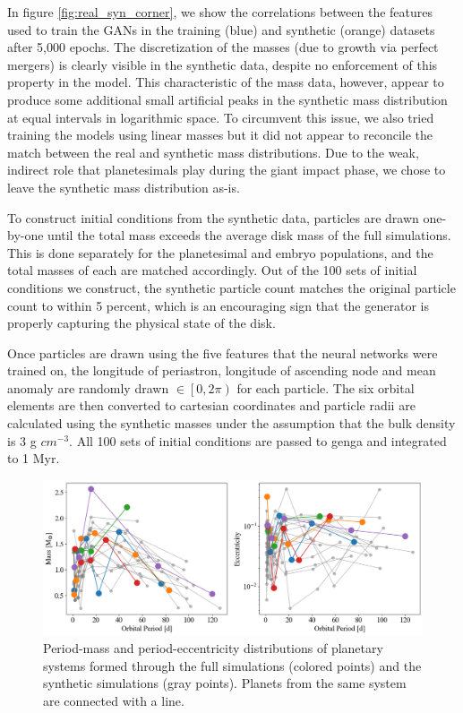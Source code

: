 
In figure \ref{fig:real_syn_corner}, we show the correlations between the features used to train the GANs in the training (blue) and synthetic (orange) datasets after 5,000 epochs. The discretization of the masses (due to growth via perfect mergers) is clearly visible in the synthetic data, despite no enforcement of this property in the model. This characteristic of the mass data, however, appear to produce some additional small artificial peaks in the synthetic mass distribution at equal intervals in logarithmic space. To circumvent this issue, we also tried training the models using linear masses but it did not appear to reconcile the match between the real and synthetic mass distributions. Due to the weak, indirect role that planetesimals play during the giant impact phase, we chose to leave the synthetic mass distribution as-is.

To construct initial conditions from the synthetic data, particles are drawn one-by-one until the total mass exceeds the average disk mass of the full simulations. This is done separately for the planetesimal and embryo populations, and the total masses of each are matched accordingly. Out of the 100 sets of initial conditions we construct, the synthetic particle count matches the original particle count to within 5 percent, which is an encouraging sign that the generator is properly capturing the physical state of the disk.

Once particles are drawn using the five features that the neural networks were trained on, the longitude of periastron, longitude of ascending node and mean anomaly are randomly drawn $\in \left[0, 2 \pi \right)$ for each particle. The six orbital elements are then converted to cartesian coordinates and particle radii are calculated using the synthetic masses under the assumption that the bulk density is 3 g $cm^{-3}$. All 100 sets of initial conditions are passed to {\sc genga} and integrated to 1 Myr.

\begin{figure}
\begin{center}
    \includegraphics[width=\textwidth]{figures/stip/per_mass_ecc_syn_comp.png}
    \caption{Period-mass and period-eccentricity distributions of planetary systems formed through the full simulations (colored points) and the synthetic simulations (gray points). Planets from the same system are connected with a line.\label{fig:per_mass_ecc_syn_comp}}
\end{center}
\end{figure}

